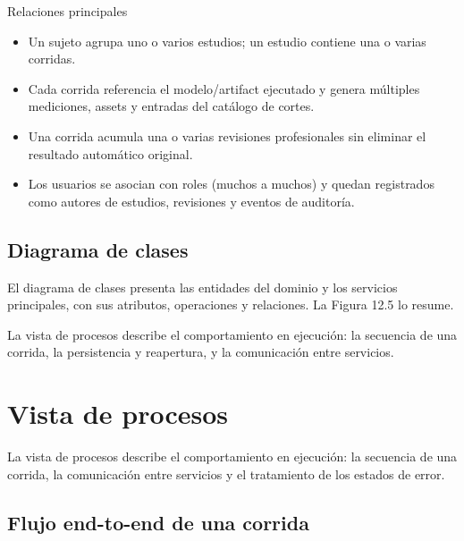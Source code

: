 Relaciones principales

\begin{itemize}
  \item Un sujeto agrupa uno o varios estudios; un estudio contiene una o varias corridas.
  \item Cada corrida referencia el modelo/artifact ejecutado y genera múltiples mediciones, assets y entradas del catálogo de cortes.
  \item Una corrida acumula una o varias revisiones profesionales sin eliminar el resultado automático original.
  \item Los usuarios se asocian con roles (muchos a muchos) y quedan registrados como autores de estudios, revisiones y eventos de auditoría.
\end{itemize}

\subsection{Diagrama de clases}

El diagrama de clases presenta las entidades del dominio y los servicios principales, con sus atributos, operaciones y relaciones. La Figura 12.5 lo resume.


La vista de procesos describe el comportamiento en ejecución: la secuencia de una corrida, la persistencia y reapertura, y la comunicación entre servicios.

\section{Vista de procesos}

La vista de procesos describe el comportamiento en ejecución: la secuencia de una corrida, la comunicación entre servicios y el tratamiento de los estados de error.

\subsection{Flujo end-to-end de una corrida}

